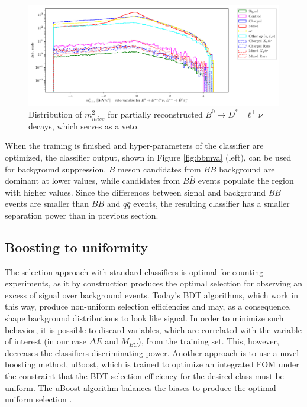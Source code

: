 \documentclass[headings=standardclasses,headings=big,oneside,a4paper,openany,12pt]{scrbook}
\newcommand {\vars}{$\Delta E$ and $M_{BC}$}
\begin{document}
\begin{figure}[H]
\centering
\captionsetup{width=0.8\linewidth}
\includegraphics[width=\linewidth]{fig/bb_partial_veto}
\caption{Distribution of $m_{miss}^2$ for partially reconstructed $B^0 \to D^{*-} \ell^+ \nu$ decays, which serves as a veto.}
\label{fig:vetoplot}
\end{figure}

When the training is finished and hyper-parameters of the classifier are optimized, the classifier output, shown in Figure \ref{fig:bbmva} (left), can be used for background suppression. $B$ meson candidates from $B \bar B$ background are dominant at lower values, while candidates from $B \bar B$ events populate the region with higher values. Since the differences between signal and background $B \bar B$ events are smaller than $B \bar B$ and $q \bar q$ events, the resulting classifier has a smaller separation power than in previous section.

\subsection{Boosting to uniformity}
The selection approach with standard classifiers is optimal for counting experiments, as it by construction produces the optimal selection for observing an excess of signal over background events. Today's BDT algorithms, which work in this way, produce non-uniform selection efficiencies and may, as a consequence, shape background distributions to look like signal. In order to minimize such behavior, it is possible to discard variables, which are correlated with the variable of interest (in our case \vars), from the training set. This, however, decreases the classifiers discriminating power. Another approach is to use a novel boosting method, uBoost, which is trained to optimize an integrated FOM under the constraint that the BDT selection efficiency for the desired class must be uniform. The uBoost algorithm balances the biases to produce the optimal uniform selection \cite{stevens2013uboost}.
\end{document}
